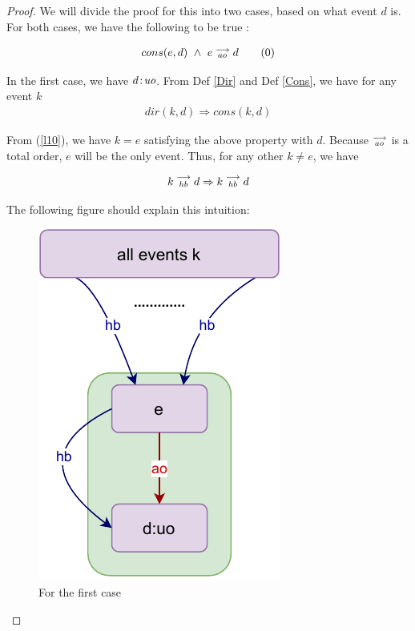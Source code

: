 \begin{proof}
    
    We will divide the proof for this into two cases, based on what event $d$ is. For both cases, we have the following to be true :
    
    \begin{align*}
        cons(e,d) \ \wedge \ e\stackrel{\longrightarrow}{_{ao}}d
        \tag{0}
        \label{l10}
    \end{align*}
        
    In the first case, we have $d\!:\!\textit{uo}$. From Def \ref{Dir} and Def \ref{Cons}, we have for any event $k$
    \begin{align*}
        dir(k,d) \Rightarrow cons(k,d)
    \end{align*}
        
    From (\ref{l10}), we have $k=e$ satisfying the above property with $d$. 
    Because $\stackrel{\longrightarrow}{_{ao}}$ is a total order, $e$ will be the only event. Thus, for any other $k \neq e$, we have 
    
    \begin{align*}
        k\stackrel{\longrightarrow}{_{hb}}d \Rightarrow k\stackrel{\longrightarrow}{_{hb}}d
    \end{align*}
    
    The following figure should explain this intuition:  
    \begin{figure}[H]
        \centering
        \includegraphics[scale=0.7]{5.InstructionReordering/3.Lemmas/lemma_proof1_case1.pdf}
        \caption{For the first case}
        \label{fig:my_label}
    \end{figure}
    

\end{proof}
